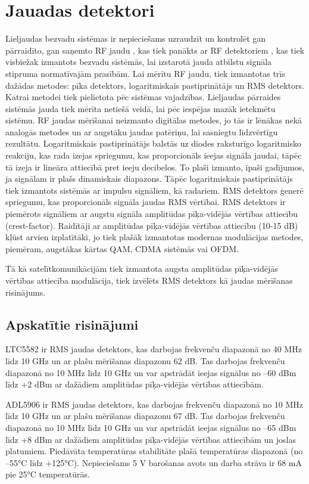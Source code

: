\section{Jauadas detektori}
Lieljaudas bezvadu sistēmas ir nepieciešams uzraudzīt un kontrolēt gan pārraidīto, gan saņemto RF jaudu \cite{rfpowerdetector}, kas tiek panākts ar RF detektoriem \cite{rfpowerdetector2}, kas tiek visbiežak izmantots bezvadu sistēmās, lai izstarotā jauda atbilstu signāla stipruma normatīvajām prasībām. Lai mērītu RF jaudu, tiek izmantotas trīs dažādas metodes: pīka detektors, logaritmiskais pastiprinātājs un RMS detektors. Katrai metodei tiek pielietota pēc sistēmas vajadzības. Lieljaudas pārraides sistēmās jauda tiek mērīta netiešā veidā, lai pēc iespējas mazāk ietekmētu sistēmu. RF jaudas mērīšanai neizmanto digitālas metodes, jo tās ir lēnākas nekā analogās metodes un ar augstāku jaudas patēriņu, lai sasniegtu līdzvērtīgu rezultātu. Logaritmiskais pastiprinātājs balstās uz diodes raksturīgo logaritmisko reakciju, kas rada izejas spriegumu, kas proporcionāls ieejas signāla jaudai, tāpēc tā izeja ir lineāra attiecībā pret ieeju decibelos. To plaši izmanto, īpaši gadījumos, ja signālam ir plašs dinamiskais diapazons. Tāpēc logaritmiskais pastiprinātājs tiek izmantots sistēmās ar impulsu signāliem, kā radariem. RMS detektors ģenerē spriegumu, kas proporcionāls signāla jaudas RMS vērtībai. RMS detektors ir piemērots signāliem ar augstu signāla amplitūdas pīķa-vidējās vērtības attiecību (crest-factor). Raidītāji ar amplitūdas pīķa-vidējās vērtības attiecību (10-15 dB) kļūst arvien izplatītāki, jo tiek plašāk izmantotas modernas modulācijas metodes, piemēram, augstākas kārtas QAM, CDMA sistēmās vai OFDM. 

Tā kā satelītkomunikācijām tiek izmantota augsta amplitūdas pīķa-vidējās vērtības attiecība modulācija, tiek izvēlēts RMS detektors kā jaudas mērīšanas risinājums.

\subsection{Apskatītie risinājumi}

LTC5582\cite{ltc5582} ir RMS jaudas detektors, kas darbojas frekvenču diapazonā no 40 MHz līdz 10 GHz un ar plašu mērīšanas diapazonu 62 dB. Tas darbojas frekvenču diapazonā no 10 MHz līdz 10 GHz un var apstrādāt ieejas signālus no –60 dBm līdz +2 dBm ar dažādiem amplitūdas pīķa-vidējās vērtības attiecībām.

ADL5906\cite{adl5906} ir RMS jaudas detektors, kas darbojas frekvenču diapazonā no 10 MHz līdz 10 GHz un ar plašu mērīšanas diapazonu 67 dB. Tas darbojas frekvenču diapazonā no 10 MHz līdz 10 GHz un var apstrādāt ieejas signālus no –65 dBm līdz +8 dBm ar dažādiem amplitūdas pīķa-vidējās vērtības attiecībām un joslas platumiem. Piedāvāta temperatūras stabilitāte plašā temperatūras diapazonā (no –55°C līdz +125°C). Nepieciešams 5 V barošanas avots un darba strāva ir 68 mA pie 25°C temperatūrās.


